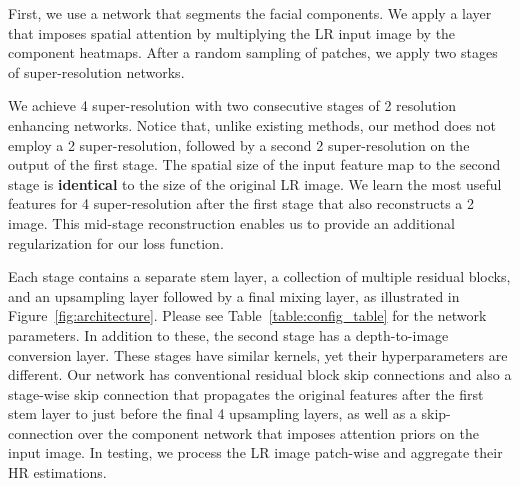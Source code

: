 \documentclass[10pt,twocolumn,letterpaper]{article}
\begin{document}
First, we use a network that segments the facial components. We apply a layer that imposes spatial attention by multiplying the LR input image by the component heatmaps. After a random sampling of patches, we apply two stages of super-resolution networks. 

We achieve 4 super-resolution with two consecutive stages of 2 resolution enhancing networks. Notice that, unlike existing methods, our method does not employ a 2 super-resolution, followed by a second 2 super-resolution on the output of the first stage. The spatial size of the input feature map to the second stage is \textbf{identical} to the size of the original LR image. We learn the most useful features for 4 super-resolution after the first stage that also reconstructs a 2 image. This mid-stage reconstruction enables us to provide an additional regularization for our loss function. 

Each stage contains a separate stem layer, a collection of multiple residual blocks, and an upsampling layer followed by a final mixing layer, as illustrated in Figure~\ref{fig:architecture}. Please see Table~\ref{table:config_table} for the network parameters. In addition to these, the second stage has a depth-to-image conversion layer. These stages have similar kernels, yet their hyperparameters are different. Our network has conventional residual block skip connections and also a stage-wise skip connection that propagates the original features after the first stem layer to just before the final 4 upsampling layers, as well as a skip-connection over the component network that imposes attention priors on the input image. In testing, we process the LR image patch-wise and aggregate their HR estimations. 
\end{document}
